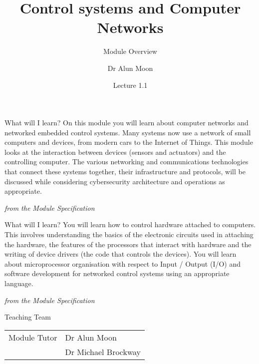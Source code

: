 \documentclass[xcolor=svgnames]{beamer}
\title{Control systems and Computer Networks}
\subtitle{Module Overview}
\author{Dr Alun Moon}
\date{Lecture 1.1}
\begin{document}
\frame{\maketitle}

\begin{frame}{What will I learn?}
On this module you will learn about computer networks and networked embedded control systems. Many systems now use a network of small
    computers and devices, from modern cars to the Internet of Things. This module looks at the interaction between devices (sensors and
    actuators) and the controlling computer. The various networking and communications technologies that connect these systems together, their
    infrastructure and protocols, will be discussed while considering cybersecurity architecture and operations as appropriate.

    \hspace*{\fill}\emph{from the Module Specification}
\end{frame}
\begin{frame}{What will I learn?}
    You will learn how to control hardware attached to computers. This involves understanding the basics of the electronic circuits used in
    attaching the hardware, the features of the processors that interact with hardware and the writing of device drivers (the code that controls the
    devices). You will learn about microprocessor organisation with respect to Input / Output (I/O) and software development for networked
    control systems using an appropriate language.

    \hspace*{\fill}\emph{from the Module Specification}
\end{frame}

\begin{frame}{Teaching Team}
\begin{tabular}{ll}
Module Tutor & Dr Alun Moon  \\
    & Dr Michael Brockway \\
\end{tabular}
\end{frame}
\end{document}
